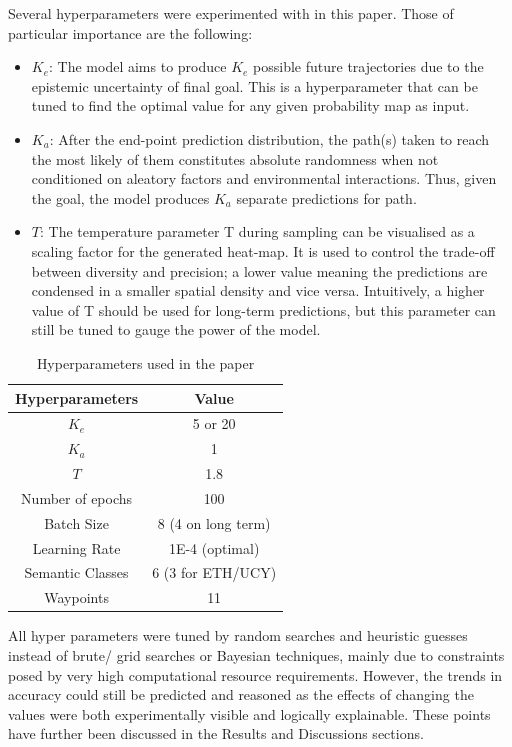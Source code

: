Several hyperparameters were experimented with in this paper. Those of particular importance are the following:

\begin{itemize}
    \item \(K_e\): The model aims to produce \(K_e\) possible future trajectories due to the epistemic uncertainty of final goal. This is a hyperparameter that can be tuned to find the optimal value for any given probability map as input.
    
    \item \(K_a\): After the end-point prediction distribution, the path(s) taken to reach the most likely of them constitutes absolute randomness when not conditioned on aleatory factors and environmental interactions. Thus, given the goal, the model produces \(K_a\) separate predictions for path.
    
    \item \(T\): The temperature parameter T during sampling can be visualised as a scaling factor for the generated heat-map. It is used to control the trade-off between diversity and precision; a lower value meaning the predictions are condensed in a smaller spatial density and vice versa. Intuitively, a higher value of T should be used for long-term predictions, but this parameter can still be tuned to gauge the power of the model.
\end{itemize}

\begin{table}[h!]
\begin{center}
\begin{tabular}{| c | c |}
 \hline
 Hyperparameters& Value\\
 \hline
 \(K_e\)& 5 or 20\\
 \(K_a\)& 1\\
 \(T\)& 1.8\\
 Number of epochs& 100 \\
 Batch Size & 8 (4 on long term)\\
 Learning Rate & 1E-4 (optimal) \\
 Semantic Classes & 6 (3 for ETH/UCY)\\
 Waypoints & 11\\
 \hline
\end{tabular}
\bigskip
\caption{Hyperparameters used in the paper}
\end{center}
\end{table}

All hyper parameters were tuned by random searches and heuristic guesses instead of brute/ grid searches or Bayesian techniques, mainly due to constraints posed by very high computational resource requirements. However, the trends in accuracy could still be predicted and reasoned as the effects of changing the values were both experimentally visible and logically explainable. These points have further been discussed in the Results and Discussions sections.

